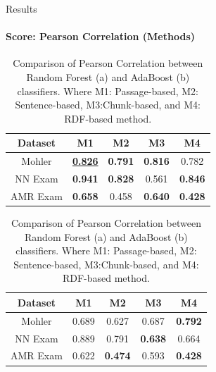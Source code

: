 \documentclass[aspectratio=169]{beamer}
\begin{document}
\begin{frame}{Results}
	\framesubtitle{Score: Pearson Correlation (Methods)}
\begin{table}
	\centering
	\begin{subtable}[c]{0.5\textwidth}
		
		\begin{tabular}{|c|c|c|c|c|}
			\hline
			Dataset & M1 & M2 & M3 & M4 \\
			\hline
			Mohler  & \underline{\textbf{0.826}}  &\textbf{0.791} &\textbf{0.816} &0.782 \\
			\hline
			NN Exam  &\textbf{0.941} &\textbf{0.828} &0.561 &\textbf{0.846} \\
			\hline
			AMR Exam  &\textbf{0.658} &0.458 &\textbf{0.640} & \textbf{0.428} \\
			\hline
		\end{tabular}
		\subcaption{}
	\end{subtable}
\centering
	\begin{subtable}[c]{0.5\textwidth}
		
		\begin{tabular}{|c|c|c|c|c|}
			\hline
			Dataset & M1 & M2 & M3 & M4 \\
			\hline
			Mohler &0.689  &0.627 &0.687 &\textbf{0.792} \\
			\hline
			NN Exam &0.889 &0.791 &\textbf{0.638} &0.664 \\
			\hline
			AMR Exam &0.622 &\textbf{0.474} &0.593 &\textbf{0.428} \\
			\hline
		\end{tabular}	
		\subcaption{}
	\end{subtable}
	\caption{Comparison of Pearson Correlation between Random Forest (a) and AdaBoost (b) classifiers. Where M1: Passage-based, M2: Sentence-based, M3:Chunk-based, and M4: RDF-based method.}
\end{table}
\end{frame}
\end{document}
